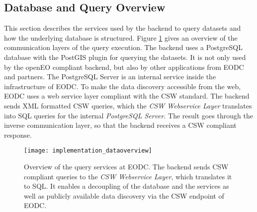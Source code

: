 \documentclass[draft,final]{vutinfth} %
\newcommand{\bgoesswein}[1]{#1}
\begin{document}
\bgoesswein{
\subsection{Database and Query Overview}
This section describes the services used by the backend to query datasets and how the underlying database is structured. Figure \ref{fig:implementation_dataoverview} gives an overview of the communication layers of the query execution. The backend uses a PostgreSQL database with the PostGIS plugin for querying the datasets. It is not only used by the openEO compliant backend, but also by other applications from EODC and partners. The PostgreSQL Server is an internal service inside the infrastructure of EODC. To make the data discovery accessible from the web, EODC uses a web service layer compliant with the CSW standard. The backend sends XML formatted CSW queries, which the \textit{CSW Webservice Layer} translates into SQL queries for the internal \textit{PostgreSQL Server}. The result goes through the inverse communication layer, so that the backend receives a CSW compliant response.  

\begin{figure}[h]
	\centering
	\texttt{[image: implementation\_dataoverview]}
	\caption{\bgoesswein{Overview of the query services at EODC. The backend sends CSW compliant queries to the \textit{CSW Webservice Layer}, which translates it to SQL. It enables a decoupling of the database and the services as well as publicly available data discovery via the CSW endpoint of EODC.}}
	\label{fig:implementation_dataoverview} %
\end{figure}

}
\end{document}
